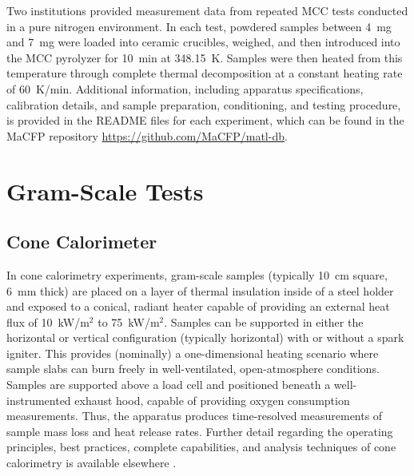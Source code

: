 \documentclass{book}
\begin{document}
Two institutions provided measurement data from repeated MCC tests conducted in a pure nitrogen environment. In each test, powdered samples between 4~mg and 7~mg were loaded into ceramic crucibles, weighed, and then introduced into the MCC pyrolyzer for 10~min at 348.15~K. Samples were then heated from this  temperature through complete thermal decomposition at a constant heating rate of 60~K/min. Additional information, including  apparatus specifications, calibration details, and sample preparation, conditioning, and testing procedure, is provided in the README files for each experiment, which can be found in the MaCFP repository \href{https://github.com/MaCFP/matl-db}{https://github.com/MaCFP/matl-db}.

\section{Gram-Scale Tests}
\label{g_tests}

\subsection{Cone Calorimeter}

In cone calorimetry experiments, gram-scale samples (typically 10~cm square, 6~mm thick) are placed on a layer of thermal insulation inside of a steel holder and exposed to a conical, radiant heater capable of providing an external heat flux of 10~kW/m$^2$ to 75~kW/m$^2$. Samples can be supported in either the horizontal or vertical configuration (typically horizontal) with or without a spark igniter. This provides (nominally) a one-dimensional heating scenario where sample slabs can burn freely in well-ventilated, open-atmosphere conditions. Samples are supported above a load cell and positioned beneath a well-instrumented exhaust hood, capable of providing oxygen consumption measurements. Thus, the apparatus produces time-resolved measurements of sample mass loss and heat release rates. Further detail regarding the operating principles, best practices, complete capabilities, and analysis techniques of cone calorimetry is available elsewhere \cite{babrauskas1984development, SFPEHandbookCone, astm1354standard}.
\end{document}
